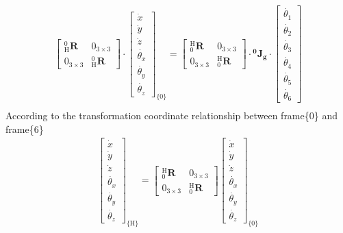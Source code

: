 \begin{equation}
\label{eq:jg6_leftmul}
\begin{split}
\begin{bmatrix}
^0_{\mathrm{H}}\mathbf{R} & 0_{ 3\times 3} \\ 
0_{ 3\times 3} & ^0_{\mathrm{H}}\mathbf{R}
\end{bmatrix}
\cdot
\begin{bmatrix}
\dot{x}\\
\dot{y}\\
\dot{z}\\
\dot{\theta _x}\\
\dot{\theta _y}\\
\dot{\theta _z}
\end{bmatrix}_{\!\{0\}}
=
\begin{bmatrix}
^{\mathrm{H}}_0\mathbf{R} & 0_{ 3\times 3} \\ 
0_{ 3\times 3} & ^{\mathrm{H}}_{0}\mathbf{R}
\end{bmatrix}
\cdot
\mathbf{^0\!J_g} \cdot 
\begin{bmatrix}
\dot{\theta _1} \\ 
\dot{\theta _2} \\ 
\dot{\theta _3} \\ 
\dot{\theta _4} \\ 
\dot{\theta _5} \\ 
\dot{\theta _6} 
\end{bmatrix}\\
\end{split}
\end{equation}
According to the transformation coordinate relationship between frame\{0\} and frame\{6\}
\begin{equation}
\label{eq: t06}
\begin{split}
\begin{bmatrix}
\dot{x}\\ 
\dot{y}\\ 
\dot{z}\\ 
\dot{\theta_x}\\ 
\dot{\theta_y}\\
\dot{\theta_z} 
\end{bmatrix}_{\!\{\mathrm{H}\}}
=
\begin{bmatrix}
^\mathrm{H}_0\mathbf{R} & 0_{ 3\times 3} \\ 
0_{ 3\times 3} & ^\mathrm{H}_0\mathbf{R}
\end{bmatrix}
\begin{bmatrix}
\dot{x}\\ 
\dot{y}\\ 
\dot{z}\\ 
\dot{\theta_x}\\ 
\dot{\theta_y}\\
\dot{\theta_z} 
\end{bmatrix}_{\!\{0\}}
\end{split}
\end{equation}
